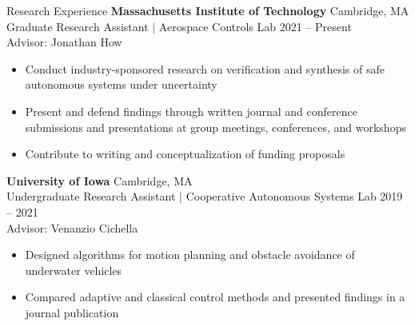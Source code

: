\begin{rSection}{Research Experience}
{\bf Massachusetts Institute of Technology} \hfill Cambridge, MA \\ 
Graduate Research Assistant $|$ Aerospace Controls Lab \hfill 2021 -- Present \\
Advisor: Jonathan How
\begin{itemize}
    \item Conduct industry-sponsored research on verification and synthesis of safe autonomous systems under uncertainty
    \item Present and defend findings through written journal and conference submissions and presentations at group meetings, conferences, and workshops 
    \item Contribute to writing and conceptualization of funding proposals
\end{itemize}

\iffalse
{\bf United States Navy} \hfill Panama City, FL \\ 
Research Intern $|$ Naval Surface Warefare Center Panama City Division \hfill 2021 \\
Advisor: Patrick Walters
\begin{itemize}
    \item Coordinated with an engineering team to deliver a robotics solution for a technical competition
    \item Conducted hardware experiments to test our solution prior to deployment
\end{itemize}
\fi

{\bf University of Iowa} \hfill Cambridge, MA \\ 
Undergraduate Research Assistant $|$ Cooperative Autonomous Systems Lab \hfill 2019 -- 2021 \\
Advisor: Venanzio Cichella
\begin{itemize}
    \item Designed algorithms for motion planning and obstacle avoidance of underwater vehicles
    \item Compared adaptive and classical control methods and presented findings in a journal publication
\end{itemize}

\end{rSection}